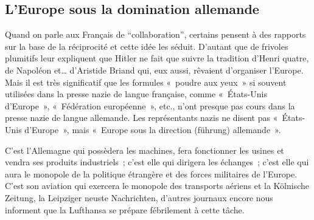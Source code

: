 \documentclass[french,twoside]{book} %
\begin{document}
\subsection[L’Europe sous la domination allemande]{L’Europe sous la domination allemande}
\noindent Quand on parle aux Français de “collaboration”, certains pensent à des rapports sur la base de la réciprocité et cette idée les séduit. D’autant que de frivoles plumitifs leur expliquent que Hitler ne fait que suivre la tradition d’Henri quatre, de Napoléon et… d’Aristide Briand qui, eux aussi, rêvaient d’organiser l’Europe. Mais il est très significatif que les formules « poudre aux yeux » si souvent utilisées dans la presse nazie de langue française, comme « États-Unis d’Europe », « Fédération européenne », etc., n’ont presque pas cours dans la presse nazie de langue allemande. Les représentants nazis ne disent pas « États-Unis d’Europe », mais « Europe sous la direction (führung) allemande ».\par
C’est l’Allemagne qui possèdera les machines, fera fonctionner les usines et vendra ses produits industriels ; c’est elle qui dirigera les échanges ; c’est elle qui aura le monopole de la politique étrangère et des forces militaires de l’Europe. C’est son aviation qui exercera le monopole des transports aériens et la Kölnische Zeitung, la Leipziger neuste Nachrichten, d’autres journaux encore nous informent que la Lufthansa se prépare fébrilement à cette tâche.
\end{document}
